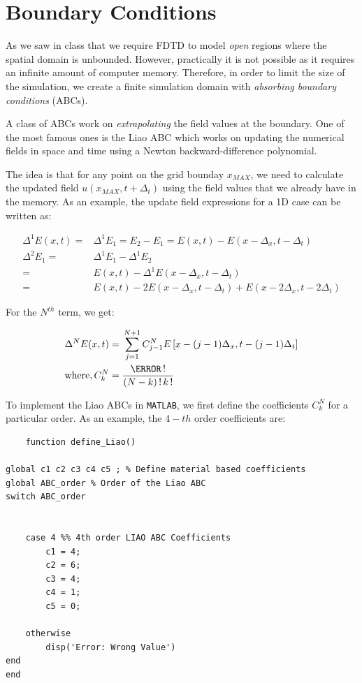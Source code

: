 \documentclass[12pt]{article}
\begin{document}
\section{Boundary Conditions}

As we saw in class that we require FDTD to model \textit{open} regions where the spatial domain is unbounded. However, practically it is not possible as it requires an infinite amount of computer memory. Therefore, in order to limit the size of the simulation, we create a finite simulation domain with \textit{absorbing boundary conditions} (ABCs).  

A class of ABCs work on \textit{extrapolating} the field values at the boundary. One of the most famous ones is the Liao ABC \cite{liao_transmitting_1984} which works on updating the numerical fields in space and time using a Newton backward-difference polynomial.

The idea is that for any point on the grid bounday $x_{MAX}$, we need to calculate the updated field $u(x_{MAX}, t + \Delta_t)$ using the field values that we already have in the memory. As an example, the update field expressions for a 1D case can be written as:

\begin{align}
\Delta^1 E(x ,t) ={} & \Delta^1 E_1 = E_2 - E_1  = E(x,t) - E(x - \Delta_x, t - \Delta_t) \nonumber \\
\Delta^2 E_1 ={} & \Delta^1 E_1 - \Delta^1 E_2 \nonumber \\
={} & E(x,t) - \Delta^1 E(x - \Delta_x, t - \Delta_t) \nonumber \\
={} & E(x,t) - 2E(x - \Delta_x, t - \Delta_t) + E(x - 2\Delta_x, t - 2\Delta_t)
\end{align}

For the $N^{th}$ term, we get:

\begin{align}
  \Delta^N E(x ,t) ={} & \sum_{j = 1}^{N+1} C_{j-1}^{N} E\left[x - (j -1)\Delta_x, t - (j -1)\Delta_t\right] \nonumber \\
  \mathrm{where,} \, C_k^N ={} & \frac{\N\,!}{(N - k)\,! \, k\,!}
\end{align}

To implement the Liao ABCs in \texttt{MATLAB}, we first define the coefficients $C_k^N$ for a particular order. As an example, the $4-th$ order coefficients are:

\begin{mdframed}[backgroundcolor=gray!20]
  \scriptsize
  \begin{verbatim}
    function define_Liao()

global c1 c2 c3 c4 c5 ; % Define material based coefficients
global ABC_order % Order of the Liao ABC 
switch ABC_order
  
        
    case 4 %% 4th order LIAO ABC Coefficients
        c1 = 4;
        c2 = 6;
        c3 = 4;
        c4 = 1;
        c5 = 0;
        
    otherwise
        disp('Error: Wrong Value')
end
end
  \end{verbatim}
\end{mdframed}
\end{document}
